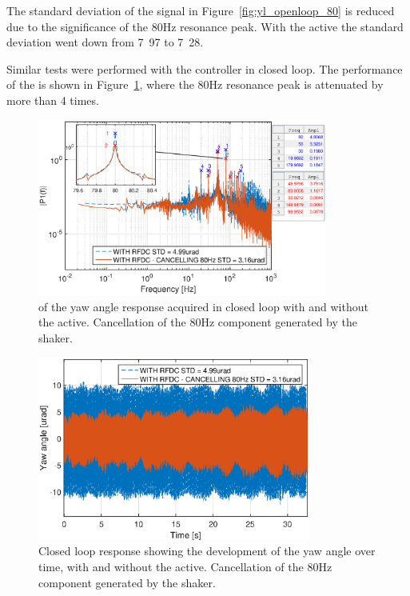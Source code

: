 The standard deviation of the signal in Figure~\ref{fig:yl_openloop_80} is reduced due to the significance of the 80Hz resonance peak. With the \abbrRFDC active the standard deviation went down from \unit{7.97}{\micro\radian} to \unit{7.28}{\micro\radian}.

Similar tests were performed with the controller in closed loop. The performance of the \abbrRFDC is shown in Figure~\ref{fig:fft_closedloop_80}, where the 80Hz resonance peak is attenuated by more than 4 times.

\begin{figure}[h!]
  \centering %
  \includegraphics[width=0.85\textwidth]{fig/matlab/fft_closedloop_ext_disturbance_80Hz_with_zoom_2}
  \caption{\label{fig:fft_closedloop_80} \abbrFFT of the yaw angle response acquired in closed loop with and without the \abbrRFDC active. Cancellation of the 80Hz component generated by the shaker.}
\end{figure}

\begin{figure}[h!]
  \centering %
  \includegraphics[width=0.8\textwidth, trim=0cm 0cm 0cm 0.7cm, clip=true]{fig/matlab/yl_closedloop_ext_disturbance_80Hz_2}
  \caption{\label{fig:yl_closedloop_80} Closed loop response showing the development of the yaw angle over time, with and without the \abbrRFDC active. Cancellation of the 80Hz component generated by the shaker.}
\end{figure}

